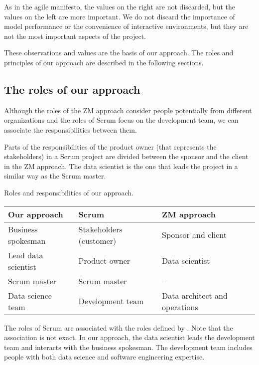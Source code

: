 As in the agile manifesto, the values on the right are not discarded, but the values on the
left are more important.  We do not discard the importance of model performance or the
convenience of interactive environments, but they are not the most important aspects of the
project.

These observations and values are the basis of our approach.  The roles and principles of
our approach are described in the following sections.

\subsection{The roles of our approach}

Although the roles of the ZM approach consider people potentially from different
organizations and the roles of Scrum focus on the development team, we can associate the
responsibilities between them.

Parts of the responsibilities of the product owner (that represents the stakeholders) in a
Scrum project are divided between the sponsor and the client in the ZM approach.  The data
scientist is the one that leads the project in a similar way as the Scrum master.

\begin{tablebox}[label=tab:roles]{Roles and responsibilities of our approach.}
  \centering
  \begin{tabular}{>{\raggedright\arraybackslash}p{2.5cm}>{\raggedright\arraybackslash}p{2.5cm}>{\raggedright\arraybackslash}p{2.5cm}}
    \toprule
    \textbf{Our approach} & \textbf{Scrum} & \textbf{ZM approach} \\
    \midrule
    Business spokesman    & Stakeholders (customer) & Sponsor and client \\
    Lead data scientist   & Product owner           & Data scientist \\
    Scrum master          & Scrum master            & -- \\
    Data science team     & Development team        & Data architect and operations \\
    \bottomrule
  \end{tabular}
  \tcblower
  The roles of Scrum are associated with the roles defined by \textcite{Zumel2019}.
  Note that the association is not exact.
  In our approach, the data scientist leads the development team and interacts with the
  business spokesman.  The development team includes people with both data science and software
  engineering expertise.
\end{tablebox}

